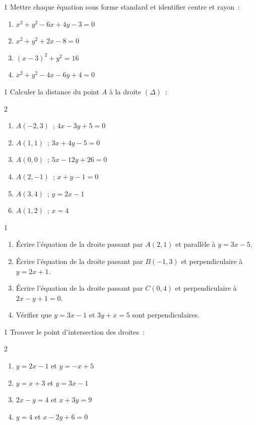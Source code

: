 \begin{exo}{1}
Mettre chaque \'equation sous forme standard et identifier centre et rayon~:
\begin{enumerate}
  \item $x^2 + y^2 - 6x + 4y - 3 = 0$
  \item $x^2 + y^2 + 2x - 8 = 0$
  \item $(x-3)^2 + y^2 = 16$
  \item $x^2 + y^2 - 4x - 6y + 4 = 0$
\end{enumerate}
\end{exo}

\begin{exo}{1}
Calculer la distance du point $A$ \`a la droite $(\Delta)$~:
\begin{multicols}{2}
\begin{enumerate}
  \item $A(-2,3)$~; $4x-3y+5=0$
  \item $A(1,1)$~; $3x+4y-5=0$
  \item $A(0,0)$~; $5x-12y+26=0$
  \item $A(2,-1)$~; $x+y-1=0$
  \item $A(3,4)$~; $y=2x-1$
  \item $A(1,2)$~; $x=4$
\end{enumerate}
\end{multicols}
\end{exo}

\begin{exo}{1}
\begin{enumerate}
  \item \'Ecrire l'\'equation de la droite passant par $A(2,1)$
        et parall\`ele \`a $y=3x-5$.
  \item \'Ecrire l'\'equation de la droite passant par $B(-1,3)$
        et perpendiculaire \`a $y=2x+1$.
  \item \'Ecrire l'\'equation de la droite passant par $C(0,4)$
        et perpendiculaire \`a $2x-y+1=0$.
  \item V\'erifier que $y=3x-1$ et $3y+x=5$ sont perpendiculaires.
\end{enumerate}
\end{exo}

\begin{exo}{1}
Trouver le point d'intersection des droites~:
\begin{multicols}{2}
\begin{enumerate}
  \item $y=2x-1$ et $y=-x+5$
  \item $y=x+3$ et $y=3x-1$
  \item $2x-y=4$ et $x+3y=9$
  \item $y=4$ et $x-2y+6=0$
\end{enumerate}
\end{multicols}
\end{exo}

